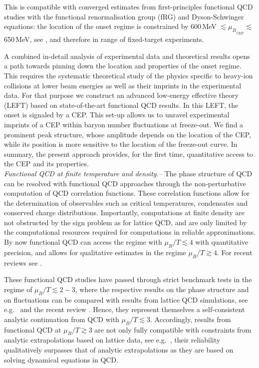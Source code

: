 \documentclass[reprint,twocolumn,superscriptaddress,preprintnumbers,amsmath,amssymb,aps,prd,floatfix]{revtex4-2}
\begin{document}
This is compatible with converged estimates from first-principles functional QCD studies with the functional renormalisation group (fRG) and Dyson-Schwinger equations: the location of the onset regime is constrained by 600\,MeV $\lesssim {\mu_B}_{_{\mathrm{CEP}}}\lesssim$\,650\,MeV, see \cite{Fu:2019hdw, Gao:2020qsj, Gao:2020fbl, Gunkel:2021oya}, and therefore in range of fixed-target experiments. 

A combined in-detail analysis of experimental data and theoretical results opens a path towards pinning down the location and properties of the onset regime. This requires the systematic theoretical study of the physics specific to heavy-ion collisions at lower beam energies as well as their imprints in the experimental data. For that purpose we construct an advanced low-energy effective theory (LEFT) based on state-of-the-art functional QCD results. In this LEFT, the onset is signaled by a CEP. This set-up allows us to unravel experimental imprints of a CEP within baryon number fluctuations at freeze-out. We find a prominent peak structure, whose amplitude depends on the location of the CEP, while its position is more sensitive to the location of the freeze-out curve. In summary, the present approach provides, for the first time, quantitative access to the CEP and its properties. \\[-1.5ex] 


\emph{Functional QCD at finite temperature and density.--}
%
The phase structure of QCD can be resolved with functional QCD approaches through the non-perturbative computation of QCD correlation functions. These correlation functions allow for the determination of observables such as critical temperatures, condensates and conserved charge distributions.  Importantly, computations at finite density are not obstructed by the sign problem as for lattice QCD, and are only limited by the computational resources required for computations in reliable approximations. By now functional QCD can access the regime with $\mu_B/T \lesssim 4$ with quantitative precision, and allows for qualitative estimates in the regime $\mu_B/T \gtrsim 4$. For recent reviews see \cite{Fischer:2018sdj, Dupuis:2020fhh, Fu:2022gou}. 

These functional QCD studies have passed through strict benchmark tests in the regime of $\mu_B/T\lesssim 2 - 3$, where the respective results on the phase structure and on fluctuations can be compared with results from lattice QCD simulations, see e.g.\ \cite{Bellwied:2015rza, Bazavov:2017dus, Bazavov:2017tot, Bazavov:2018mes, Borsanyi:2018grb, Bazavov:2020bjn, Bollweg:2022fqq} and the recent review \cite{Aarts:2023vsf}. Hence, they represent themselves a self-consistent analytic continuation from QCD with $\mu_B/T\lesssim 3$. Accordingly, results from functional QCD at $\mu_B/T\gtrsim 3$ are not only fully compatible with constraints from analytic extrapolations based on lattice data, see e.g.~\cite{Mukherjee:2019eou, Bollweg:2022rps, Borsanyi:2022soo, Aarts:2023vsf}, their reliability qualitatively surpasses that of analytic extrapolations as they are based on  solving dynamical equations in QCD. 
\end{document}
